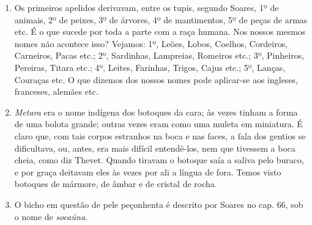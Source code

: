 \begin{enumerate}
\item Os primeiros apelidos derivavam, entre os tupis, segundo Soares, 1º de animais, 2º 
de peixes, 3º de árvores, 4º de mantimentos, 5º de peças de armas etc.
É o que sucede por toda a parte com a raça humana. Nos nossos mesmos nomes não 
acontece isso? Vejamos: 1º, Leões, Lobos, Coelhos, Cordeiros, Carneiros, Pacas etc.; 2º, 
Sardinhas, Lampreias, Romeiros etc.; 3º, Pinheiros, Pereiras, Titara etc.; 4º, Leites, 
Farinhas, Trigos, Cajus etc.; 5º, Lanças, Couraças etc. O que dizemos dos nossos nomes 
pode aplicar-se aos ingleses, franceses, alemães etc.

\item \textit{Metara} era o nome indígena dos botoques da cara; às vezes tinham a forma de uma 
bolota grande; outras vezes eram como uma muleta em miniatura. É claro que, com tais 
corpos estranhos na boca e nas faces, a fala dos gentios se dificultava, ou, antes, era 
mais difícil entendê-los, nem que tivessem a boca cheia, como diz Thevet. Quando 
tiravam o botoque saía a saliva pelo buraco, e por graça deitavam eles às vezes por ali a 
língua de fora. Temos visto botoques de mármore, de âmbar e de cristal de rocha.

\item O bicho em questão de pele peçonhenta é descrito por Soares no cap. 66, sob o 
nome de \textit{socaúna}.


\end{enumerate}
